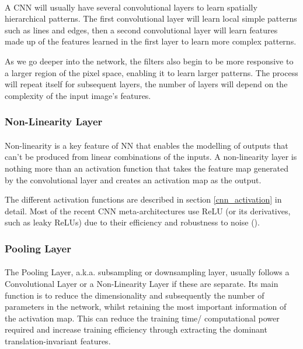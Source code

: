 \paragraph{}     
A \gls{CNN} will usually have several convolutional layers to learn spatially hierarchical patterns. The first convolutional layer will learn local simple patterns such as lines and edges, then a second convolutional layer will learn features made up of the features learned in the first layer to learn more complex patterns. 

As we go deeper into the network, the filters also begin to be more responsive to a larger region of the pixel space, enabling it to learn larger patterns. The process will repeat itself for subsequent layers, the number of layers will depend on the complexity of the input image's features.

\subsubsection{Non-Linearity Layer}
\paragraph{}
Non-linearity is a key feature of \gls{NN} that enables the modelling of outputs that can't be produced from linear combinations of the inputs.
A non-linearity layer is nothing more than an activation function that takes the feature map generated by the convolutional layer and creates an activation map as the output. 

The different activation functions are described in section \ref{cnn_activation} in detail. Most of the recent \gls{CNN} meta-architectures use \gls{ReLU} (or its derivatives, such as leaky \gls{ReLU}s) due to their efficiency and robustness to noise (\cite{he2015delving}).

\subsubsection{Pooling Layer}
\paragraph{}
The Pooling Layer, \gls{a.k.a.} subsampling or downsampling layer, usually follows a Convolutional Layer or a Non-Linearity Layer if these are separate. 
Its main function is to reduce the dimensionality and subsequently the number of parameters in the network, whilst retaining the most important information of the activation map. This can reduce the training time/ computational power required and increase training efficiency through extracting the dominant translation-invariant features.


